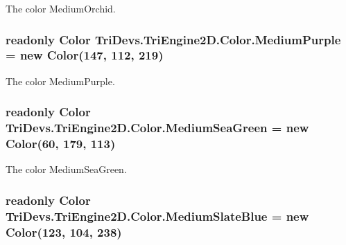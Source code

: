 The color Medium\-Orchid. 

\hypertarget{struct_tri_devs_1_1_tri_engine2_d_1_1_color_af40d778587de61985601bf91672d1504}{
\subsubsection[{Medium\-Purple}]{\setlength{\rightskip}{0pt plus 5cm}readonly {\bf Color} Tri\-Devs.\-Tri\-Engine2\-D.\-Color.\-Medium\-Purple = new {\bf Color}(147, 112, 219)\hspace{0.3cm}{\ttfamily [static]}}}\label{struct_tri_devs_1_1_tri_engine2_d_1_1_color_af40d778587de61985601bf91672d1504}


The color Medium\-Purple. 

\hypertarget{struct_tri_devs_1_1_tri_engine2_d_1_1_color_a57de4b1e52fdd316f15226473beb6293}{
\subsubsection[{Medium\-Sea\-Green}]{\setlength{\rightskip}{0pt plus 5cm}readonly {\bf Color} Tri\-Devs.\-Tri\-Engine2\-D.\-Color.\-Medium\-Sea\-Green = new {\bf Color}(60, 179, 113)\hspace{0.3cm}{\ttfamily [static]}}}\label{struct_tri_devs_1_1_tri_engine2_d_1_1_color_a57de4b1e52fdd316f15226473beb6293}


The color Medium\-Sea\-Green. 

\hypertarget{struct_tri_devs_1_1_tri_engine2_d_1_1_color_afe9f39e12bdca208a996f8be55533854}{
\subsubsection[{Medium\-Slate\-Blue}]{\setlength{\rightskip}{0pt plus 5cm}readonly {\bf Color} Tri\-Devs.\-Tri\-Engine2\-D.\-Color.\-Medium\-Slate\-Blue = new {\bf Color}(123, 104, 238)\hspace{0.3cm}{\ttfamily [static]}}}\label{struct_tri_devs_1_1_tri_engine2_d_1_1_color_afe9f39e12bdca208a996f8be55533854}


